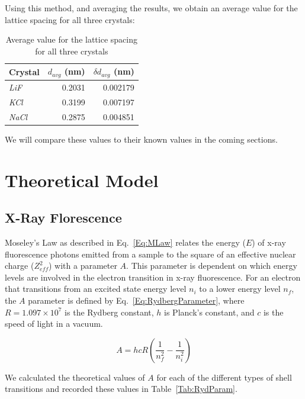 \documentclass[%
 reprint,
 amsmath,amssymb,
 aps,
 pra,
]{revtex4-1}
\begin{document}
\noindent Using this method, and averaging the results, we obtain an average value for the lattice spacing for all three crystals:

\begin{table}[htbp]
	\begin{center}
	\begin{tabular}{|l|r|r|}
		\hline
		Crystal & \multicolumn{1}{l|}{$d_{avg}$ (nm)} & \multicolumn{1}{l|}{$\delta d_{avg}$ (nm)} \\ \hline
		\textit{LiF} & 0.2031 & 0.002179 \\ \hline
		\textit{KCl} & 0.3199 & 0.007197 \\ \hline
		\textit{NaCl} & 0.2875 & 0.004851 \\ \hline
	\end{tabular}
	\end{center}
	\caption{Average value for the lattice spacing for all three crystals}
	\label{table:d_average}
\end{table}

\noindent We will compare these values to their known values in the coming sections.

\section{Theoretical Model}

\subsection{X-Ray Florescence}

Moseley's Law as described in Eq.~\ref{Eq:MLaw} relates the energy ($E$) of x-ray fluorescence photons emitted from a sample to the square of an effective nuclear charge ($Z_{eff}^{2}$) with a parameter $A$. This parameter is dependent on which energy levels are involved in the electron transition in x-ray fluorescence. For an electron that transitions from an excited state energy level $n_{i}$ to a lower energy level $n_{f}$, the $A$ parameter is defined by Eq.~\ref{Eq:RydbergParameter}, where $R = 1.097 \times 10^7$ is the Rydberg constant, $h$ is Planck's constant, and $c$ is the speed of light in a vacuum.

\begin{equation}\label{Eq:RydbergParameter}
A = hcR(\frac{1}{n_{f}^{2}} - \frac{1}{n_{i}^{2}})
\end{equation}

We calculated the theoretical values of $A$ for each of the different types of shell transitions and recorded these values in Table~\ref{Tab:RydParam}.
\end{document}
